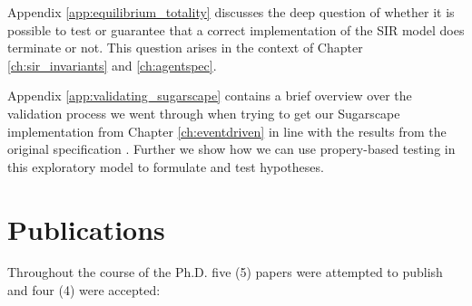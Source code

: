 \medskip

Appendix \ref{app:equilibrium_totality} discusses the deep question of whether it is possible to test or guarantee that a correct implementation of the SIR model does terminate or not. This question arises in the context of Chapter \ref{ch:sir_invariants} and \ref{ch:agentspec}.

\medskip

Appendix \ref{app:validating_sugarscape} contains a brief overview over the validation process we went through when trying to get our Sugarscape implementation from Chapter \ref{ch:eventdriven} in line with the results from the original specification \cite{epstein_growing_1996}. Further we show how we can use propery-based testing in this exploratory model to formulate and test hypotheses.

\newpage

\section{Publications}
Throughout the course of the Ph.D. five (5) papers were attempted to publish and four (4) were accepted:

